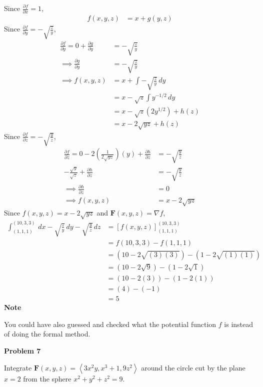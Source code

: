 \documentclass{article}
\newcommand{\lrp}[1]{\left( #1 \right)}
\newcommand{\lra}[1]{\left\langle #1 \right\rangle}
\newcommand{\lrb}[1]{\left[ #1 \right]}
\newcommand{\F}[0]{\mathbf{F}}
\begin{document}
Since $\displaystyle \frac{\partial f}{\partial x}=1$,
\begin{align*}
    f(x,y,z)&=x+g(y,z)
\end{align*}
Since $\displaystyle \frac{\partial f}{\partial y}=-\sqrt{\frac{z}{y}}$,
\begin{align*}
    \frac{\partial f}{\partial y}=0+\frac{\partial g}{\partial y}&=-\sqrt{\frac{z}{y}}\\
    \implies \frac{\partial g}{\partial y}&=-\sqrt{\frac{z}{y}}\\
    \implies f(x,y,z)&=x+\int-\sqrt{\frac{z}{y}}\,dy\\
    &=x-\sqrt{z}\int y^{-1/2}\,dy\tag{we can take constants out}\\
    &=x-\sqrt{z}\lrp{2y^{1/2}}+h(z)\\
    &=x-2\sqrt{yz}+h(z)
\end{align*}
Since $\displaystyle \frac{\partial f}{\partial z}=-\sqrt{\frac{y}{z}}$,
\begin{align*}
    \frac{\partial f}{\partial z}=0-2\lrp{\frac{1}{2\sqrt{yz}}}\lrp{{y}}+\frac{\partial h}{\partial z}&=-\sqrt{\frac{y}{z}}\\
    -\frac{\sqrt{y}}{\sqrt{z}}+\frac{\partial h}{\partial z}&=-\sqrt{\frac{y}{z}}\\
    \implies \frac{\partial h}{\partial z}&=0\\
    \implies f(x,y,z)&=x-2\sqrt{yz}\tag{let $C=0$ aka ignore $C$}
\end{align*}
Since $f(x,y,z)=x-2\sqrt{yz}$ and $\displaystyle \F(x,y,z)=\nabla f$,
\begin{align*}
    \int_{(1,1,1)}^{(10,3,3)}\,dx-\sqrt{\frac{z}{y}}\,dy-\sqrt{\frac{y}{z}}\,dz&=\lrb{f(x,y,z)}_{(1,1,1)}^{(10,3,3)}\\
    &=f(10,3,3)-f(1,1,1)\\
    &=\lrp{10-2\sqrt{(3)(3)}}-\lrp{1-2\sqrt{(1)(1)}}\\
    &=\lrp{10-2\sqrt{9}}-\lrp{1-2\sqrt{1}}\\
    &=\lrp{10-2(3)}-\lrp{1-2(1)}\\
    &=\lrp{4}-\lrp{-1}\\
    &=\boxed{5}
\end{align*}
\textbf{Note}

You could have also guessed and checked what the potential function $f$ is instead of doing the formal method.

{}\textbf{Problem 7}

Integrate $\F(x,y,z)=\lra{3x^2y,x^3+1,9z^2}$ around the circle cut by the plane $x=2$ from the sphere $x^2+y^2+z^2=9$.
\end{document}
